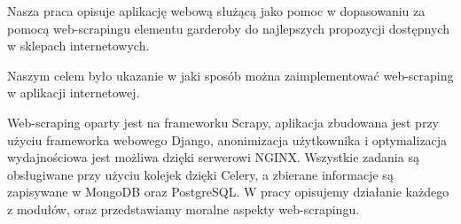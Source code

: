 
Nasza praca opisuje aplikację webową służącą jako pomoc w dopasowaniu za pomocą web-scrapingu elementu garderoby do najlepszych propozycji dostępnych w sklepach internetowych. 

Naszym celem było ukazanie w jaki sposób można zaimplementować web-scraping w aplikacji internetowej.

Web-scraping oparty jest na frameworku Scrapy, aplikacja zbudowana jest przy użyciu frameworka webowego Django, anonimizacja użytkownika i optymalizacja wydajnościowa jest możliwa dzięki serwerowi NGINX. Wszystkie zadania są obsługiwane przy użyciu kolejek dzięki Celery, a zbierane informacje są zapisywane w MongoDB oraz PostgreSQL. W pracy opisujemy działanie każdego z modułów, oraz przedstawiamy moralne aspekty web-scrapingu.